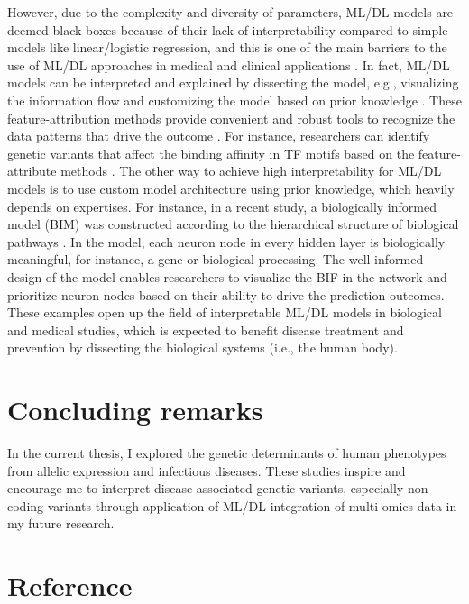 \documentclass{book}
\begin{document}
\begin{refsection}
However, due to the complexity and diversity of parameters, ML/DL models are deemed black boxes because of their lack of interpretability compared to simple models like linear/logistic regression, and this is one of the main barriers to the use of ML/DL approaches in medical and clinical applications \cite{Miotto2017Deep,Vollmer2020Machine}.
In fact, ML/DL models can be interpreted and explained by dissecting the model, e.g., visualizing the information flow and customizing the model based on prior knowledge \cite{Zhou2021Feature,Elmarakeby2021Biologically,Spinner2019explAIner}.
These feature-attribution methods provide convenient and robust tools to recognize the data patterns that drive the outcome \cite{Zhou2021Feature}.
For instance, researchers can identify genetic variants that affect the binding affinity in TF motifs based on the feature-attribute methods \cite{Avsec2021Base}.
The other way to achieve high interpretability for ML/DL models is to use custom model architecture using prior knowledge, which heavily depends on expertises.
For instance, in a recent study, a biologically informed model (BIM) was constructed according to the hierarchical structure of biological pathways \cite{Elmarakeby2021Biologically}.
In the model, each neuron node in every hidden layer is biologically meaningful, for instance, a gene or biological processing.
The well-informed design of the model enables researchers to visualize the BIF in the network and prioritize neuron nodes based on their ability to drive the prediction outcomes.
These examples open up the field of interpretable ML/DL models in biological and medical studies, which is expected to benefit disease treatment and prevention by dissecting the biological systems (i.e., the human body).

\section*{Concluding remarks}
In the current thesis, I explored the genetic determinants of human phenotypes from allelic expression and infectious diseases.
These studies inspire and encourage me to interpret disease associated genetic variants, especially non-coding variants through application of ML/DL integration of multi-omics data in my future research.

\section*{Reference}
\printbibliography[heading=none]

\clearpage

\end{refsection}
\end{document}
